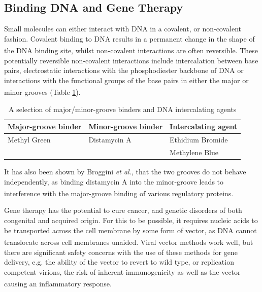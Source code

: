 \subsection{Binding DNA and Gene Therapy}
Small molecules can either interact with DNA in a covalent, or non-covalent fashion. Covalent binding to DNA results in a permanent change in the shape of the DNA binding site, whilst non-covalent interactions are often reversible.\textsuperscript{\cite{Hamilton2012NaturalBinders}} These potentially reversible non-covalent interactions include intercalation between base pairs, electrostatic interactions with the phosphodiester backbone of DNA or interactions with the functional groups of the base pairs in either the major or minor grooves (Table \ref{DNA_binders}).\textsuperscript{\cite{Hamilton2012NaturalBinders,Tuite1997EffectsDichroism}} 

\begin{table}[ht!]
\centering
\caption{A selection of major/minor-groove binders and DNA intercalating agents}
\begin{tabular}{l|l|l}
\textbf{Major-groove binder} &\textbf{Minor-groove binder} &\textbf{Intercalating agent} \\
\hline
Methyl Green& Distamycin A & Ethidium Bromide\\
& & Methylene Blue\\
\end{tabular}
\label{DNA_binders}
\end{table}

It has also been shown by Broggini \textit{et al.}, that the two grooves do not behave independently, as binding distamycin A into the minor-groove leads to interference with the major-groove binding of various regulatory proteins.\textsuperscript{\cite{Broggini1989DistamycinsElements.}}

Gene therapy has the potential to cure cancer, and genetic disorders of both congenital and acquired origin.  For this to be possible, it requires nucleic acids to be transported across the cell membrane by some form of vector, as DNA cannot translocate across cell membranes unaided.\textsuperscript{\cite{Ghosh2008EfficientNanoparticles}} Viral vector methods work well, but there are significant safety concerns with the use of these methods for gene delivery, e.g.  the ability of the vector to revert to wild type, or replication competent virions, the risk of inherent immunogenicity as well as the vector causing an inflammatory response.\textsuperscript{\cite{Ghosh2008EfficientNanoparticles,Kim2016PolycationsApplications}} 

